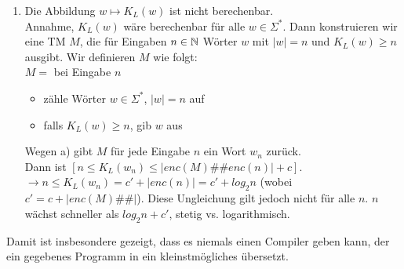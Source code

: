 \begin{enumerate}
        \item Die Abbildung $w \mapsto K_{L}(w)$ ist nicht berechenbar. \\
            \LOES Annahme, $K_{L}(w)$ wäre berechenbar für alle $w \in \Sigma^{*}$. Dann konstruieren wir eine TM $M$, die für Eingaben $n \in \mathbb{N}$ Wörter $w$ mit $|w| = n$ und $K_{L}(w) \geq n$ ausgibt.
            Wir definieren $M$ wie folgt: \\
            $M =$ bei Eingabe $n$
            \begin{itemize}
                \item zähle Wörter $w \in \Sigma^{*}$, $|w| = n$ auf
                \item falls $K_{L}(w) \geq n$, gib $w$ aus
            \end{itemize}
            Wegen a) gibt $M$ für jede Eingabe $n$ ein Wort $w_{n}$ zurück. \\
            Dann ist $[n \leq K_{L}(w_{n}) \leq |enc(M)\#\#enc(n)| + c]$. \\
            $\to n \leq K_{L}(w_{n}) = c' + |enc(n)| = c' + log_{2}n$ (wobei $c' = c + |enc(M)\#\#|$).{}
            Diese Ungleichung gilt jedoch nicht für alle $n$. $n$ wächst schneller als $log_{2}n + c'$, stetig vs. logarithmisch.
    \end{enumerate}
    Damit ist insbesondere gezeigt, dass es niemals einen Compiler geben kann, der ein gegebenes Programm in ein kleinstmögliches übersetzt.

